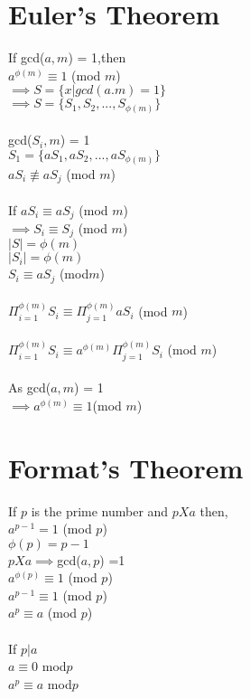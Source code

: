\documentclass[11pt]{article}
\begin{document}
\section*{Euler's Theorem}
If gcd($a,m$) = 1,then \\
$a^{\phi(m)} \equiv 1$ (mod $m$) \\
$\implies S = \{x | gcd(a.m) = 1\}$ \\
$\implies S = \{S_{1},S_{2},...,S_{\phi(m)}\}$ \\\\
gcd($S_{i},m$) = 1 \\
$S_{1} = \{aS_{1},aS_{2},...,aS_{\phi(m)}\}$ \\
$aS_{i} \not\equiv aS_{j}$ (mod $m$) \\\\
If $aS_{i} \equiv aS_{j}$ (mod $m$) \\
$\implies S_{i} \equiv S_{j}$ (mod $m$) \\
$|S| = \phi(m)$ \\
$|S_{i}| = \phi(m)$ \\
$S_{i} \equiv aS_{j}$ (mod$m$) \\\\
$\Pi^{\phi(m)}_{i=1} S_{i} \equiv \Pi^{\phi(m)}_{j=1} aS_{i}$ (mod $m$)\\\\
$\Pi^{\phi(m)}_{i=1} S_{i} \equiv a^{\phi(m)}\Pi^{\phi(m)}_{j=1} S_{i}$ (mod $m$) \\\\
As gcd($a,m$) = 1\\
$\implies a^{\phi(m)} \equiv 1$(mod $m$) 

\section*{Format's Theorem}
If $p$ is the prime number and $p X a$ then, \\
$a^{p-1} = 1$ (mod $p$) \\
$\phi(p) = p-1$ \\
$p X a \implies $gcd($a,p$) =1 \\
$a^{\phi(p)} \equiv 1$ (mod $p$) \\
$a^{p-1} \equiv 1$ (mod $p$) \\
$a^{p} \equiv a$ (mod $p$) \\\\
If $p \vert a$ \\
$a \equiv 0$ mod$p$ \\
$a^p \equiv a$ mod$p$ 
\end{document}
